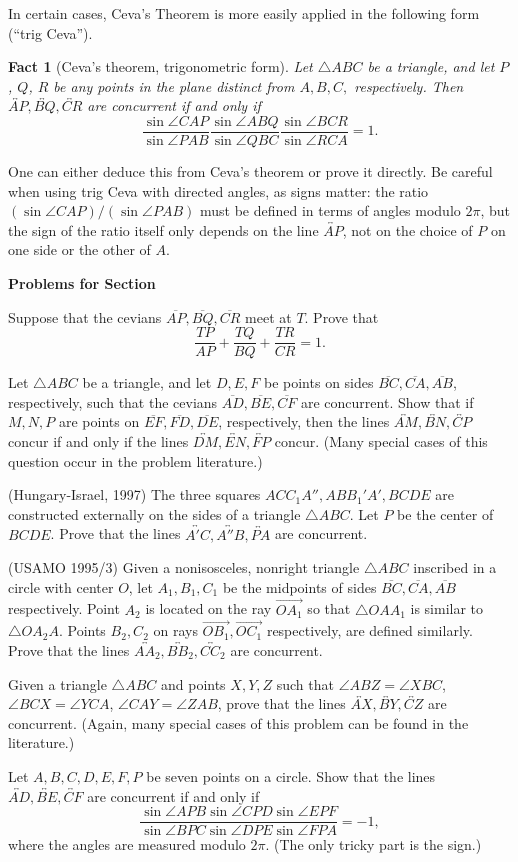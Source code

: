 \documentclass[12pt]{book}
\newcounter{exc}
\numberwithin{exc}{section}
\numberwithin{figure}{section}
\newenvironment{exer}{\vspace{0.1in}
\noindent \textbf{Problems for Section~\thesection} \vspace{0.1in}
\begin{list}{\arabic{exc}.}{\usecounter{exc}}}{\end{list}}
\newtheorem{fact}[theorem]{Fact}
\numberwithin{equation}{theorem}
\def\ii{\item}
\def\ang{\angle}
\def\sang{\sin \angle}
\def\line#1{\overleftrightarrow{#1}}
\def\ray#1{\overrightarrow{#1}}
\def\seg#1{\overline{#1}}
\begin{document}
In certain cases, Ceva's Theorem is more easily applied in the 
following form (``trig Ceva''). 
\begin{fact}[Ceva's theorem, trigonometric form]
Let $\triangle ABC$ be a triangle, and let $P$, $Q$, $R$ be any points in the 
plane distinct from $A, B, C,$ respectively. Then $\line{AP}, \line{BQ}, 
\line{CR}$ are 
concurrent if and only if
\[
\frac{\sang CAP}{\sang PAB} \frac{\sang ABQ}{\sang QBC}
\frac{\sang BCR}{\sang RCA} = 1.
\]
\end{fact}
One can either deduce this from Ceva's theorem or prove it directly.
Be careful when using trig Ceva
with directed angles, as signs matter: the ratio $(\sang CAP)/(\sang PAB)$
must be defined in terms of angles modulo $2\pi$, but the sign of the
ratio itself only depends on the line $\line{AP}$, not on the choice of $P$
on one side or the other of $A$.

\begin{exer}
\ii
Suppose that the cevians $\seg{AP}, \seg{BQ}, \seg{CR}$ meet at $T$. Prove that
\[
\frac{TP}{AP} + \frac{TQ}{BQ} + \frac{TR}{CR} = 1.
\]
\ii
Let $\triangle ABC$ be a triangle, and 
let $D, E, F$ be points on sides $\seg{BC}, \seg{CA}, \seg{AB}$,
respectively, such that the cevians $\seg{AD}, \seg{BE}, \seg{CF}$ 
are concurrent. Show
that if $M, N, P$ are points on $\seg{EF}, \seg{FD}, \seg{DE}$, 
respectively, then the
lines $\line{AM}, \line{BN}, \line{CP}$ concur if and only if the
 lines $\line{DM}, \line{EN}, \line{FP}$
concur.
(Many special cases of this question occur in the problem literature.)
\ii (Hungary-Israel, 1997)
The three squares $ACC_1A'', ABB_1'A', BCDE$ are constructed externally
on the sides of a triangle $\triangle 
ABC$. Let $P$ be the center of $BCDE$. Prove that
the lines $\line{A'C}, \line{A''B}, \line{PA}$ are concurrent.
\ii (USAMO 1995/3)
Given a nonisosceles, nonright triangle $\triangle ABC$ inscribed in a
circle with center $O$, let
$A_1,B_1,C_1$ be the midpoints of
sides $\seg{BC}, \seg{CA}, \seg{AB}$ respectively.
Point $A_2$ is located on the ray
$\ray{OA_1}$ so that $\triangle OAA_1$ is similar to
$\triangle OA_2A$.  Points $B_2, C_2$ on rays $\ray{OB_1}, \ray{OC_1}$
respectively, are defined similarly.  
Prove that the lines $\line{AA_2}, \line{BB_2}, \line{CC_2}$ are concurrent.
\ii
Given a triangle $\triangle ABC$ and points $X, Y, Z$ such that 
$\ang ABZ = \ang XBC$, $\ang BCX = \ang YCA$, $\ang CAY = \ang ZAB$,
prove that the lines $\line{AX}, \line{BY}, \line{CZ}$ 
are concurrent. (Again, many special cases
of this problem can be found in the literature.)
\ii
Let $A, B, C, D, E, F,P$ be seven points on a circle.
Show that the lines $\line{AD}, \line{BE},
\line{CF}$ are concurrent if and only if
\[
\frac{\sang APB \sang CPD \sang EPF}{\sang BPC \sang DPE \sang FPA} = -1,
\]
where the angles are measured 
modulo $2\pi$. (The only tricky part is the sign.)
\end{exer}
\end{document}
